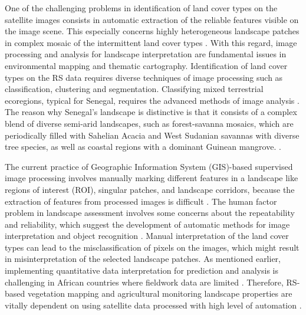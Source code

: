 \documentclass[earth,article,submit,pdftex,moreauthors]{Definitions/mdpi}
\begin{document}
One of the challenging {problems} in identification of land cover types on the satellite images consists in automatic extraction of the reliable features {visible on the }image scene{. This especially concerns }highly heterogeneous landscape patches in complex mosaic of {the }intermittent land cover types \cite{CAMPOS2018211,SYIFA2020919}. With this regard, image processing and analysis for landscape interpretation {are} fundamental {issues} in environmental mapping and thematic cartography. Identification of land cover types on the {RS data} requires diverse techniques of image processing such as classification, clustering and segmentation. {Classifying} mixed terrestrial ecoregions, {typical for} Senegal, requires the {advanced methods of} image analysis \cite{BUDDE2004481}. {The reason why Senegal's} landscape is distinctive {is that it consists of} a complex {blend} of diverse semi-arid landscapes, such as forest-savanna mosaics, {which are periodically filled} with Sahelian Acacia and West Sudanian {savannas} with diverse tree species, as well as coastal regions with {a dominant} Guinean {mangrove}.
\cite{TAPPAN2004427,DEANS2003253}.

{The current practice {of Geographic Information System (GIS)-based supervised image processing }involves manually marking different} features in {a{ }landscape like} regions of interest (ROI), singular patches, and landscape corridors, {because} the {extraction of features from processed images is difficult}
 \cite{CABRAL2017115}. {The} human factor {problem} in landscape {assessment} {involves }some concerns {about} {the }repeatability and reliability, which {suggest} the development of automatic methods {for} image interpretation and {object} recognition \cite{CONCHEDDA2008578,rs9020181,rs12091436}. {Manual interpretation of the} land cover types can {lead to the} misclassification of pixels on the images, which {might }{result in} misinterpretation of {the }selected landscape patches. {As mentioned earlier, implementing quantitative} data interpretation for prediction and analysis {is challenging} in African countries {where fieldwork} data {are limited }\cite{STOORVOGEL2009161}. Therefore, {RS}{-based vegetation mapping and agricultural monitoring {landscape properties }are vitally dependent} on using satellite data processed with high level of automation
 \cite{PEREZHOYOS2020102064,BRANDT2016215}.  
\end{document}
